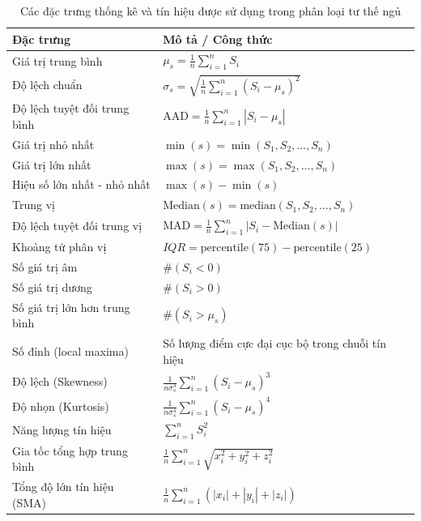 \begin{table}[htbp]
\caption{Các đặc trưng thống kê và tín hiệu được sử dụng trong phân loại tư thế ngủ}
\label{tab:features}
\begin{center}
\renewcommand{\arraystretch}{1.5}
\begin{tabular}{|l|p{9.5cm}|}
\hline
\textbf{Đặc trưng} & \textbf{Mô tả / Công thức} \\
\hline
Giá trị trung bình & $\mu_s = \frac{1}{n} \sum_{i=1}^{n} S_i$ \\
\hline
Độ lệch chuẩn & $\sigma_s = \sqrt{\frac{1}{n} \sum_{i=1}^{n} (S_i - \mu_s)^2}$ \\
\hline
Độ lệch tuyệt đối trung bình & $\text{AAD} = \frac{1}{n} \sum_{i=1}^{n} |S_i - \mu_s|$ \\
\hline
Giá trị nhỏ nhất & $\min(s) = \min(S_1, S_2, \ldots, S_n)$ \\
\hline
Giá trị lớn nhất & $\max(s) = \max(S_1, S_2, \ldots, S_n)$ \\
\hline
Hiệu số lớn nhất - nhỏ nhất & $\max(s) - \min(s)$ \\
\hline
Trung vị & $\text{Median}(s) = \text{median}(S_1, S_2, \ldots, S_n)$ \\
\hline
Độ lệch tuyệt đối trung vị & $\text{MAD} = \frac{1}{n} \sum_{i=1}^{n} |S_i - \text{Median}(s)|$ \\
\hline
Khoảng tứ phân vị & $IQR = \text{percentile}(75) - \text{percentile}(25)$ \\
\hline
Số giá trị âm & $\#(S_i < 0)$ \\
\hline
Số giá trị dương & $\#(S_i > 0)$ \\
\hline
Số giá trị lớn hơn trung bình & $\#(S_i > \mu_s)$ \\
\hline
Số đỉnh (local maxima) & Số lượng điểm cực đại cục bộ trong chuỗi tín hiệu \\
\hline
Độ lệch (Skewness) & $\frac{1}{n \sigma_s^3} \sum_{i=1}^{n} (S_i - \mu_s)^3$ \\
\hline
Độ nhọn (Kurtosis) & $\frac{1}{n \sigma_s^4} \sum_{i=1}^{n} (S_i - \mu_s)^4$ \\
\hline
Năng lượng tín hiệu & $\sum_{i=1}^{n} S_i^2$ \\
\hline
Gia tốc tổng hợp trung bình & $\frac{1}{n} \sum_{i=1}^{n} \sqrt{x_i^2 + y_i^2 + z_i^2}$ \\
\hline
Tổng độ lớn tín hiệu (SMA) & $\frac{1}{n} \sum_{i=1}^{n} (|x_i| + |y_i| + |z_i|)$ \\
\hline
\end{tabular}
\end{center}
\end{table}

